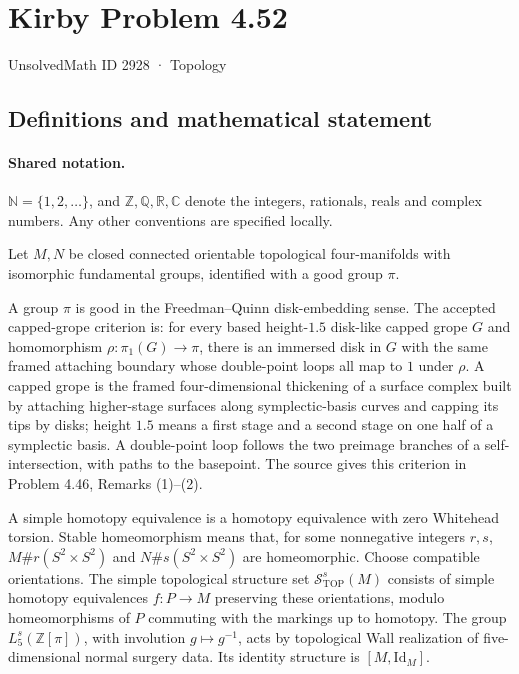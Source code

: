 \documentclass[11pt]{article}
\begin{document}
\setcounter{section}{2927}
\section{Kirby Problem 4.52}\label{2928}
{\small\sffamily UnsolvedMath ID 2928 · Topology}
\subsection{Definitions and mathematical statement}

\paragraph{Shared notation.}$\mathbb N=\{1,2,\ldots\}$, and $\mathbb Z,\mathbb Q,\mathbb R,\mathbb C$ denote the integers, rationals, reals and complex numbers. Any other conventions are specified locally.


Let $M,N$ be closed connected orientable topological four-manifolds with isomorphic fundamental groups, identified with a good group $\pi$.

A group $\pi$ is good in the Freedman--Quinn disk-embedding sense. The accepted capped-grope criterion is: for every based height-$1.5$ disk-like capped grope $G$ and homomorphism $\rho:\pi_1(G)\to\pi$, there is an immersed disk in $G$ with the same framed attaching boundary whose double-point loops all map to $1$ under $\rho$. A capped grope is the framed four-dimensional thickening of a surface complex built by attaching higher-stage surfaces along symplectic-basis curves and capping its tips by disks; height $1.5$ means a first stage and a second stage on one half of a symplectic basis. A double-point loop follows the two preimage branches of a self-intersection, with paths to the basepoint. The source gives this criterion in Problem 4.46, Remarks (1)--(2).

A simple homotopy equivalence is a homotopy equivalence with zero Whitehead torsion. Stable homeomorphism means that, for some nonnegative integers $r,s$, $M\#r(S^2\times S^2)$ and $N\#s(S^2\times S^2)$ are homeomorphic. Choose compatible orientations. The simple topological structure set $\mathcal S^s_{\mathrm{TOP}}(M)$ consists of simple homotopy equivalences $f:P\to M$ preserving these orientations, modulo homeomorphisms of $P$ commuting with the markings up to homotopy. The group $L_5^s(\mathbb Z[\pi])$, with involution $g\mapsto g^{-1}$, acts by topological Wall realization of five-dimensional normal surgery data. Its identity structure is $[M,\mathrm{Id}_M]$.
\end{document}
